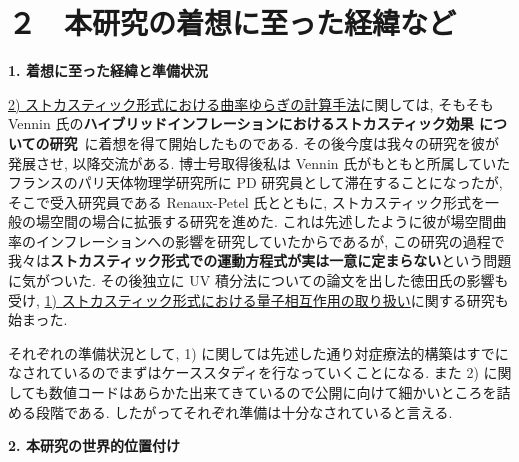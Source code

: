 \documentclass[11pt,a4j,dvipdfmx]{jarticle} 					%
\newcommand{\研究課題名}{\mgfamily\sffamily ストカスティック形式で迫る重力と量子論}
\newcommand{\研究機関名}{\mgfamily\sffamily 名古屋大学}
\newcommand{\研究代表者氏名}{\mgfamily\sffamily 多田祐一郎}
\newcommand{\研究期間の最終元号年度}{34}  %
\renewcommand{\emph}[1]{{\sffamily\gtfamily\bfseries #1}}
\begin{document}



\section{２　本研究の着想に至った経緯など}


\begin{mdframed}[roundcorner=0.5zw,
	innertopmargin=0.8zw,innerbottommargin=0.8zw,
	linecolor=black!50,linewidth=0.2zw,
	backgroundcolor=black!10]
	{\bfseries\gtfamily\sffamily\large 1. 着想に至った経緯と準備状況}
\end{mdframed}

\ul{2) ストカスティック形式における曲率ゆらぎの計算手法}に関しては, そもそも Vennin 氏の\emph{ハイブリッドインフレーションにおけるストカスティック効果
についての研究}~\cite{Martin:2011ib}に着想を得て開始したものである. その後今度は我々の研究を彼が発展させ, 以降交流がある.
博士号取得後私は Vennin 氏がもともと所属していたフランスのパリ天体物理学研究所に PD 研究員として滞在することになったが, 
そこで受入研究員である Renaux-Petel 氏とともに, ストカスティック形式を一般の場空間の場合に拡張する研究を進めた.
これは先述したように彼が場空間曲率のインフレーションへの影響を研究していたからであるが,
この研究の過程で我々は\emph{ストカスティック形式での運動方程式が実は一意に定まらない}という問題に気がついた.
その後独立に UV 積分法についての論文を出した徳田氏の影響も受け, \ul{1) ストカスティック形式における量子相互作用の取り扱い}に関する研究も始まった.

それぞれの準備状況として, 1) に関しては先述した通り対症療法的構築はすでになされているのでまずはケーススタディを行なっていくことになる.
また 2) に関しても数値コードはあらかた出来てきているので公開に向けて細かいところを詰める段階である. したがってそれぞれ準備は十分なされていると言える.

\begin{mdframed}[roundcorner=0.5zw,
	innertopmargin=0.8zw,innerbottommargin=0.8zw,
	linecolor=black!50,linewidth=0.2zw,
	backgroundcolor=black!10]
	{\bfseries\gtfamily\sffamily\large 2. 本研究の世界的位置付け}
\end{mdframed}
\end{document}
